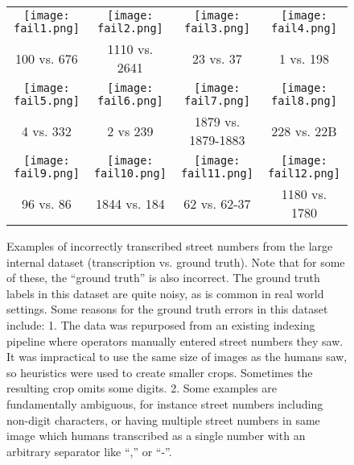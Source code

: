 \documentclass{article} \usepackage{comment}
\begin{document}
\begin{figure}
\begin{centering}
\begin{tabular}{cccc}
\texttt{[image: fail1.png]} & \texttt{[image: fail2.png]}
& \texttt{[image: fail3.png]} & \texttt{[image: fail4.png]} \\
100 vs. 676& 1110 vs. 2641 & 23 vs. 37 & 1 vs. 198 \\
\texttt{[image: fail5.png]} & \texttt{[image: fail6.png]}
& \texttt{[image: fail7.png]} & \texttt{[image: fail8.png]} \\
4 vs. 332 & 2 vs 239 & 1879 vs. 1879-1883 & 228 vs. 22B \\
\texttt{[image: fail9.png]} & \texttt{[image: fail10.png]}
& \texttt{[image: fail11.png]} & \texttt{[image: fail12.png]} \\
96 vs. 86 & 1844 vs. 184 & 62 vs. 62-37 & 1180 vs. 1780 \\
\end{tabular}
\caption{
Examples of incorrectly transcribed street numbers from the large internal dataset (transcription vs. ground truth). Note that for
some of these, the ``ground truth'' is also incorrect.
The ground truth labels in this dataset are quite noisy, as is common in real world settings.
Some reasons for the ground truth errors in this dataset include:
1. The data was repurposed from an existing indexing pipeline where operators manually entered street
numbers they saw. It was impractical to use the same size of images as the humans saw, so heuristics
were used to create smaller crops. Sometimes the resulting crop omits some digits.
2. Some examples are fundamentally ambiguous, for instance street numbers including non-digit characters, or having multiple street numbers in same image which humans transcribed as a single number with an arbitrary separator like ``,'' or ``-''.
}
\label{fig:failure}
\end{centering}
\end{figure}
\end{document}
